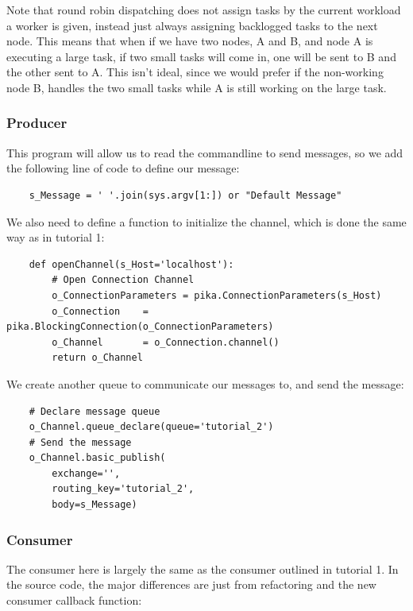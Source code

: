 \documentclass{article}
\begin{document}
Note that round robin dispatching does not assign tasks by the current workload a worker is given, instead just always assigning backlogged tasks to the next node. This means that when if we have two nodes, A and B, and node A is executing a large task, if two small tasks will come in, one will be sent to B and the other sent to A. This isn't ideal, since we would prefer if the non-working node B, handles the two small tasks while A is still working on the large task.

\subsubsection{Producer}

This program will allow us to read the commandline to send messages, so we add the following line of code to define our message:

\begin{verbatim}
    s_Message = ' '.join(sys.argv[1:]) or "Default Message"
\end{verbatim}

We also need to define a function to initialize the channel, which is done the same way as in tutorial 1:

\begin{verbatim}
    def openChannel(s_Host='localhost'):
        # Open Connection Channel
        o_ConnectionParameters = pika.ConnectionParameters(s_Host)
        o_Connection    = pika.BlockingConnection(o_ConnectionParameters)
        o_Channel       = o_Connection.channel()
        return o_Channel
\end{verbatim}

We create another queue to communicate our messages to, and send the message:

\begin{verbatim}
    # Declare message queue
    o_Channel.queue_declare(queue='tutorial_2')
    # Send the message
    o_Channel.basic_publish(
        exchange='',
        routing_key='tutorial_2',
        body=s_Message)
\end{verbatim}

\subsubsection{Consumer}

The consumer here is largely the same as the consumer outlined in tutorial 1. In the source code, the major differences are just from refactoring and the new consumer callback function:
\end{document}

